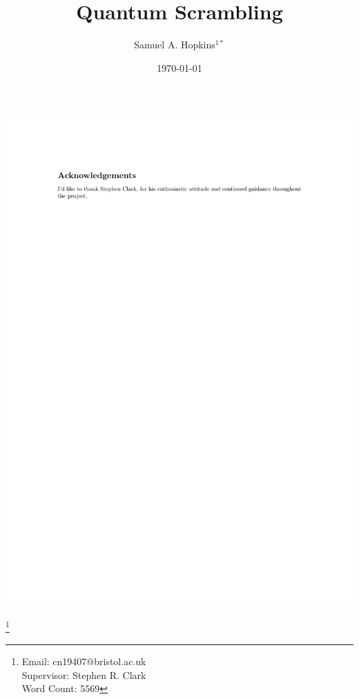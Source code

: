 \documentclass[aps]{revtex4-2}
\begin{document}
\includegraphics[width = \textwidth]{ackno.pdf}
% 

\title{Quantum Scrambling}

\author{Samuel A. Hopkins$^{1*}$}
\date{\today}
\thanks{Email: cn19407@bristol.ac.uk\\
Supervisor: Stephen R. Clark\\
Word Count: 5569
}

\maketitle



\end{document}
